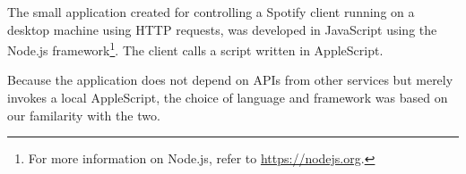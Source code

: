The small application created for controlling a Spotify client running on a desktop machine using HTTP requests, was developed in JavaScript using the Node.js framework\footnote{For more information on Node.js, refer to \url{https://nodejs.org}.}. The client calls a script written in AppleScript.

Because the application does not depend on APIs from other services but merely invokes a local AppleScript, the choice of language and framework was based on our familarity with the two.

